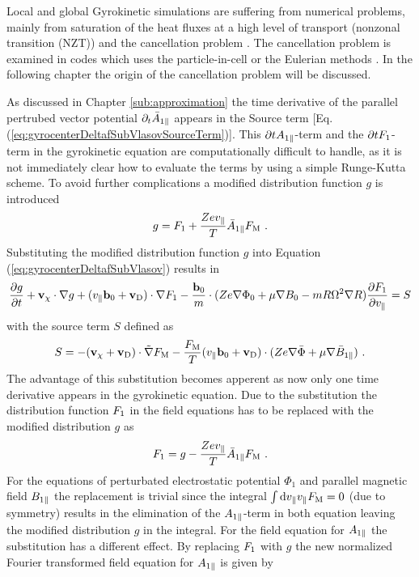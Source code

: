 Local and global Gyrokinetic simulations are suffering from numerical problems, mainly from saturation of the heat fluxes at a high level of transport (nonzonal transition (NZT)) and the cancellation problem \cite{Chen2001}. The cancellation problem is examined in codes which uses the particle-in-cell or the Eulerian methods \cite{Cummings_PHD}. In the following chapter the origin of the cancellation problem will be discussed.\bigskip

As discussed in Chapter \ref{sub:approximation} the time derivative of the parallel pertrubed vector potential $\partial_t \bar{A}_{1\parallel}$ appears in the Source term [Eq. (\ref{eq:gyrocenterDeltafSubVlasovSourceTerm})]. This $\partial t A_{1\parallel}$-term and the $\partial t F_1$-term in the gyrokinetic equation are computationally difficult to handle, as it is not immediately clear how to evaluate the terms by using a simple Runge-Kutta scheme. To avoid further complications a modified distribution function $g$ is introduced
\begin{gather}
	g = F_1 + \frac{Ze v_\parallel}{T} \bar{A}_{1\parallel} F_\mathrm{M} ~.
	\label{eq:modifiedDistributionFunction}
\end{gather}
Substituting the modified distribution function $g$ into Equation (\ref{eq:gyrocenterDeltafSubVlasov}) results in
\begin{gather}
	\frac{\partial g}{\partial t} + \boldsymbol{\mathbf{v}}_\chi \cdot \nabla g + (v_\parallel \boldsymbol{\mathbf{b}}_0 + \boldsymbol{\mathbf{v}}_\mathrm{D}) \cdot \nabla F_1 - \frac{\boldsymbol{\mathbf{b}}_0}{m} \cdot (Z e \nabla \Phi_0 + \mu \nabla B_0 - m R \Omega^2 \nabla R) \frac{\partial F_1}{\partial v_\parallel} = S
	\label{eq:modifiedGyrocenterDeltafSubVlasov}
\end{gather}
with the source term $S$ defined as
\begin{gather}
	S = - (\boldsymbol{\mathbf{v}}_\chi + \boldsymbol{\mathbf{v}}_\mathrm{D}) \cdot \tilde{\nabla} F_\mathrm{M} - \frac{F_\mathrm{M}}{T} (v_\parallel \boldsymbol{\mathbf{b}}_0 + \boldsymbol{\mathbf{v}}_\mathrm{D}) \cdot (Ze \nabla \bar{\Phi} + \mu \nabla \bar{B}_{1\parallel}) ~.
	\label{eq:modifiedSourceTerm}
\end{gather}
The advantage of this substitution becomes apperent as now only one time derivative appears in the gyrokinetic equation. Due to the substitution the distribution function $F_1$ in the field equations has to be replaced with the modified distribution $g$ as
\begin{gather}
	F_1 = g - \frac{Ze v_\parallel}{T} \bar{A}_{1\parallel} F_\mathrm{M} ~.
\end{gather}
For the equations of perturbated electrostatic potential $\Phi_1$ and parallel magnetic field $B_{1\parallel}$ the replacement is trivial since the integral $\int \mathrm{d}v_\parallel v_\parallel F_\mathrm{M} = 0$ (due to symmetry) results in the elimination of the $A_{1\parallel}$-term in both equation leaving the modified distribution $g$ in the integral. For the field equation for $A_{1\parallel}$ the substitution has a different effect. By replacing $F_1$ with $g$ the new normalized Fourier transformed field equation for $A_{1\parallel}$ is given by
